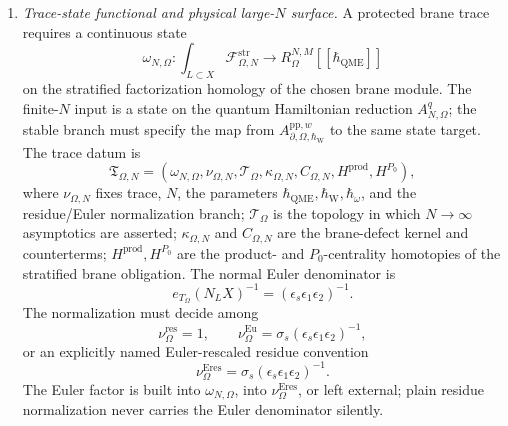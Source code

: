 \begin{enumerate}
{  are proved targets; a choice of branch or a comparison between them
  is part of the data.  No external CFG-style source fixture is asserted.}

  \item \emph{Trace-state functional and physical large-\(N\) surface.}
  A protected brane trace requires a continuous state
  \[
    \omega_{N,\Omega}\colon
    \int_{L\subset X}\mathcal F^{\mathrm{str}}_{\Omega,N}
    \longrightarrow
    R_\Omega^{N,M}[[\hbar_{\mathrm{QME}}]]
  \]
  on the stratified factorization homology of the chosen brane module.
  The finite-\(N\) input is a state on the quantum Hamiltonian reduction
  \(A^q_{N,\Omega}\); the stable branch must specify the map from
  \(A^{\mathrm{pp},w}_{\partial,\Omega,\hbar_{\mathrm{W}}}\) to the same state target.
  The trace datum is
  \[
    \mathfrak T_{\Omega,N}
    =
    (\omega_{N,\Omega},
     \nu_{\Omega,N},
     \mathcal T_\Omega,
     \kappa_{\Omega,N},
     C_{\Omega,N},
     H^{\mathrm{prod}},
     H^{P_0}),
  \]
  where \(\nu_{\Omega,N}\) fixes trace, \(N\), the parameters
  \(\hbar_{\mathrm{QME}},\hbar_{\mathrm{W}},\hbar_\omega\), and the
  residue/Euler normalization branch; \(\mathcal T_\Omega\) is the
  topology in which \(N\to\infty\) asymptotics are asserted;
  \(\kappa_{\Omega,N}\) and \(C_{\Omega,N}\) are the brane-defect kernel
  and counterterms; \(H^{\mathrm{prod}},H^{P_0}\) are the
  product- and \(P_0\)-centrality homotopies of the stratified brane
  obligation.  The normal Euler denominator is
  \[
    e_{T_\Omega}(N_LX)^{-1}
      =
      (\epsilon_s\epsilon_1\epsilon_2)^{-1}.
  \]
  The normalization must decide among
  \[
    \nu_\Omega^{\mathrm{res}}=1,\qquad
    \nu_\Omega^{\mathrm{Eu}}
      =
      \sigma_s(\epsilon_s\epsilon_1\epsilon_2)^{-1},
  \]
  or an explicitly named Euler-rescaled residue convention
  \[
    \nu_\Omega^{\mathrm{Eres}}
      =
      \sigma_s(\epsilon_s\epsilon_1\epsilon_2)^{-1}.
  \]
  The Euler factor is built into \(\omega_{N,\Omega}\), into
  \(\nu_\Omega^{\mathrm{Eres}}\), or left external; plain residue
  normalization never carries the Euler denominator silently.


\end{enumerate}
